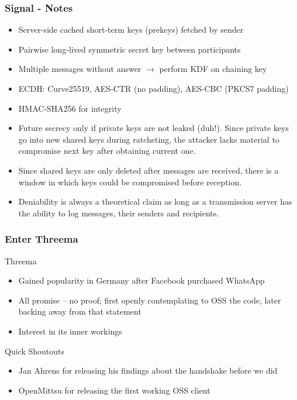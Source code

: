 \documentclass[
	aspectratio=169,
	xetex,
]{beamer}
\begin{document}
\begin{frame}
	\frametitle{Signal - Notes}
	\begin{itemize}
		\item Server-side cached short-term keys (\alert{prekeys}) fetched by sender
		\item Pairwise long-lived symmetric secret key between participants
		\item Multiple messages without answer $\rightarrow$ perform KDF on \alert{chaining key}
		\item ECDH: Curve25519, AES-CTR (no padding), AES-CBC (PKCS7 padding)
		\item HMAC-SHA256 for integrity
		\item Future secrecy only if private keys are not leaked (duh!). Since private keys go into new shared keys during ratcheting, the attacker lacks material to compromise next key after obtaining current one.
		\item Since shared keys are only deleted after messages are received, there is a window in which keys could be compromised before reception. 
		\item Deniability is always a theoretical claim as long as a transmission server has the ability to log messages, their senders and recipients.

	\end{itemize}
\end{frame}


\begin{frame}
	\frametitle{Enter Threema}
	Threema
	\begin{itemize}
		\item Gained popularity in Germany after Facebook purchased WhatsApp
		\item All promise -- no proof; first openly contemplating to OSS the code, later backing away from that statement
		\item Interest in its inner workings
	\end{itemize}

	Quick Shoutouts
	\begin{itemize}
		\item Jan Ahrens for releasing his findings about the handshake before we did
		\item OpenMittsu for releasing the first working OSS client
	\end{itemize}
	
\end{frame}
\end{document}
